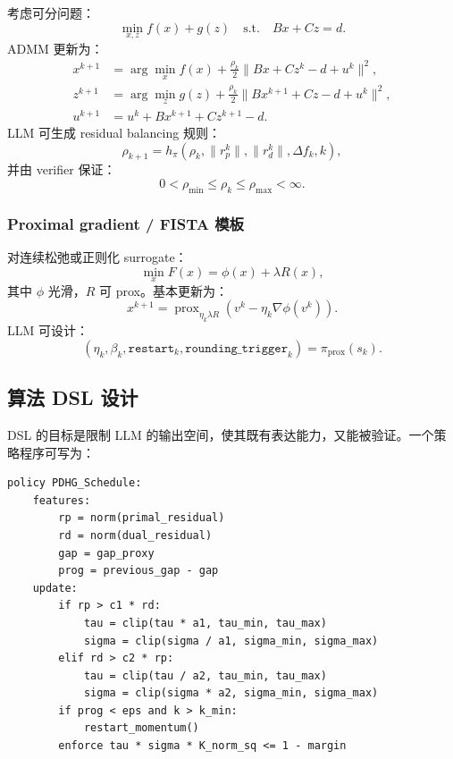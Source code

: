 \documentclass[UTF8,a4paper,12pt,fontset=fandol]{ctexart}
\begin{document}
考虑可分问题：
\begin{equation}
\min_{x,z} f(x)+g(z) \quad \text{s.t.} \quad Bx+Cz=d.
\end{equation}
ADMM 更新为：
\begin{equation}
\begin{aligned}
x^{k+1} &= \arg\min_x f(x) + \frac{\rho_k}{2}\|Bx+Cz^k-d+u^k\|^2,\\
z^{k+1} &= \arg\min_z g(z) + \frac{\rho_k}{2}\|Bx^{k+1}+Cz-d+u^k\|^2,\\
u^{k+1} &= u^k + Bx^{k+1}+Cz^{k+1}-d.
\end{aligned}
\end{equation}
LLM 可生成 residual balancing 规则：
\begin{equation}
\rho_{k+1}=h_\pi(\rho_k,\|r^k_p\|,\|r^k_d\|,\Delta f_k,k),
\end{equation}
并由 verifier 保证：
\begin{equation}
0<\rho_{\min}\le \rho_k \le \rho_{\max}<\infty.
\end{equation}

\subsubsection{Proximal gradient / FISTA 模板}

对连续松弛或正则化 surrogate：
\begin{equation}
\min_x F(x)=\phi(x)+\lambda R(x),
\end{equation}
其中 $\phi$ 光滑，$R$ 可 prox。基本更新为：
\begin{equation}
x^{k+1}=\operatorname{prox}_{\eta_k\lambda R}(v^k-\eta_k \nabla \phi(v^k)).
\end{equation}
LLM 可设计：
\begin{equation}
(\eta_k,\beta_k,\texttt{restart}_k,\texttt{rounding\_trigger}_k)
=\pi_{\text{prox}}(s_k).
\end{equation}

\subsection{算法 DSL 设计}

DSL 的目标是限制 LLM 的输出空间，使其既有表达能力，又能被验证。一个策略程序可写为：
\begin{verbatim}
policy PDHG_Schedule:
    features:
        rp = norm(primal_residual)
        rd = norm(dual_residual)
        gap = gap_proxy
        prog = previous_gap - gap
    update:
        if rp > c1 * rd:
            tau = clip(tau * a1, tau_min, tau_max)
            sigma = clip(sigma / a1, sigma_min, sigma_max)
        elif rd > c2 * rp:
            tau = clip(tau / a2, tau_min, tau_max)
            sigma = clip(sigma * a2, sigma_min, sigma_max)
        if prog < eps and k > k_min:
            restart_momentum()
        enforce tau * sigma * K_norm_sq <= 1 - margin
\end{verbatim}
\end{document}
